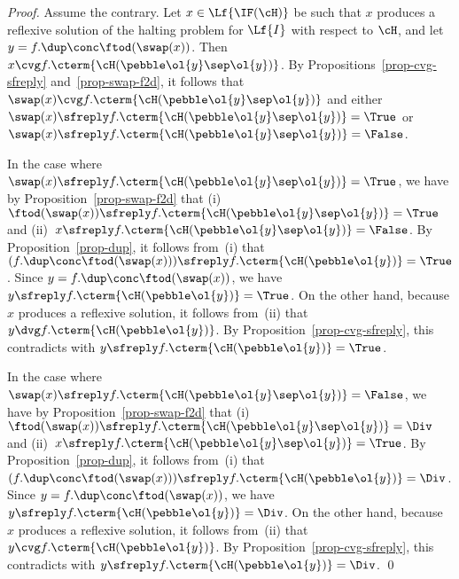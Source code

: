 \documentclass[fleqn]{llncs}
\begin{document}
\begin{proof}
Assume the contrary.
Let $x \in \Lf{\IF(\cH)}$ be such that $x$ produces a re\-flexive
solution of the halting problem for $\Lf{I}$ with respect to $\cH$, and
let $y = f.\dup \conc \ftod(\swap(x))$.
Then $x \cvg f.\cterm{\cH(\pebble \ol{y} \sep \ol{y})}$.
By Propositions~\ref{prop-cvg-sfreply} and~\ref{prop-swap-f2d}, it
fol\-lows that $\swap(x) \cvg f.\cterm{\cH(\pebble \ol{y} \sep \ol{y})}$
and either
$\swap(x) \sfreply f.\cterm{\cH(\pebble \ol{y} \sep \ol{y})} = \True$ or
$\swap(x) \sfreply\linebreak[2] f.\cterm{\cH(\pebble \ol{y} \sep \ol{y})}
  = \False$.

In the case where
$\swap(x) \sfreply f.\cterm{\cH(\pebble \ol{y} \sep \ol{y})} = \True$,
we have by Proposition~\ref{prop-swap-f2d} that
(i)~$\ftod(\swap(x)) \sfreply f.\cterm{\cH(\pebble \ol{y} \sep \ol{y})}
       = \True$ and
(ii)~$x \sfreply f.\cterm{\cH(\pebble \ol{y} \sep \ol{y})} = \False$.
By Proposition~\ref{prop-dup}, it follows from~(i) that
$(f.\dup \conc \ftod(\swap(x))) \sfreply f.\cterm{\cH(\pebble \ol{y})} =
 \True$.
Since $y = f.\dup \conc\linebreak \ftod(\swap(x))$, we have
$y \sfreply f.\cterm{\cH(\pebble \ol{y})} = \True$.
On the other hand, because $x$ produces a reflexive solution, it follows
from~(ii) that $y \dvg f.\cterm{\cH(\pebble \ol{y})}$.
By Proposition~\ref{prop-cvg-sfreply}, this contradicts with
$y \sfreply f.\cterm{\cH(\pebble \ol{y})} = \True$.

In the case where
$\swap(x) \sfreply f.\cterm{\cH(\pebble \ol{y} \sep \ol{y})} = \False$,
we have by Proposition~\ref{prop-swap-f2d} that
(i)~$\ftod(\swap(x)) \sfreply f.\cterm{\cH(\pebble \ol{y} \sep \ol{y})}
       = \Div$ and
(ii)~$x \sfreply f.\cterm{\cH(\pebble \ol{y} \sep \ol{y})} =
\True$.
By Proposition~\ref{prop-dup}, it follows from~(i) that
$(f.\dup \conc \ftod(\swap(x))) \sfreply f.\cterm{\cH(\pebble \ol{y})} =
 \Div$.
Since $y = f.\dup \conc \ftod(\swap(x))$, we have
$y \sfreply f.\cterm{\cH(\pebble \ol{y})} = \Div$.
On the other hand, because $x$ produces a reflexive solution, it follows
from~(ii) that $y \cvg f.\cterm{\cH(\pebble \ol{y})}$.
By Proposition~\ref{prop-cvg-sfreply}, this contradicts with
$y \sfreply f.\cterm{\cH(\pebble \ol{y})} = \Div$.
\qed
\end{proof}
\end{document}
